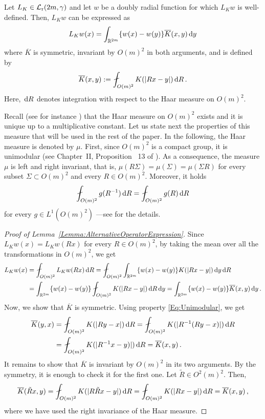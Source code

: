\begin{lemma} \label{Lemma:AlternativeOperatorExpression}
Let $L_K \in \mathcal{L}_{\mathrm{r}}(2m,\gamma)$ and let $w$ be a doubly radial function for which $L_K w$ is well-defined. Then, $L_K w$ can be expressed as
$$
L_K w(x) = \int_{\mathbb{R}^{2m}} \{w(x) - w(y)\} \overline{K}(x,y) \,\mathrm{d} y
$$
where $\overline{K}$ is symmetric, invariant by $O(m)^2$ in both arguments, and is defined by
\begin{equation*}
\overline{K}(x,y) := \average_{O(m)^2} K(|Rx - y|)\d R\,.
\end{equation*}
Here, $\,\mathrm{d} R$ denotes integration with respect to the Haar measure on $O(m)^2$.
\end{lemma}

Recall (see for instance \cite{Nachbin}) that the Haar measure on $O(m)^2$ exists and it is unique up to a
multiplicative constant. Let us state next the properties of this measure that will be used in the rest of the
paper. In the following, the Haar measure is denoted by $\mu$. First, since $O(m)^2$ is a compact
group, it is unimodular (see Chapter~II, Proposition~ 13 of \cite{Nachbin}). As a consequence, the
measure $\mu$ is left and right invariant, that is, $\mu(R\Sigma) = \mu(\Sigma) = \mu(\Sigma R) $
for every subset $\Sigma \subset O(m)^2$ and every $R\in O(m)^2$. Moreover, it holds
\begin{equation}
\label{Eq:Unimodular}
\average_{O(m)^2} g(R^{-1}) \d R = \average_{O(m)^2} g(R) \d R
\end{equation}	
for every $g\in L^1(O(m)^2)$ ---see \cite{Nachbin} for the details.

\begin{proof}[Proof of Lemma~\ref{Lemma:AlternativeOperatorExpression}]
Since $L_K w (x) = L_K w (Rx)$ for every $R\in O(m)^2$, by taking the mean over all the transformations in $O(m)^2$, we get
\begin{align*}
L_K w(x) &= \average_{O(m)^2} L_K w(Rx)\d R =  \average_{O(m)^2} \int_{\R^{2m}} \{w(x) - w(y)\}K(|Rx - y|) \d y \d R\\
&= \int_{\R^{2m}} \{w(x) - w(y)\}  \average_{O(m)^2} K(|Rx - y|) \d R  \d y = \int_{\R^{2m}} \{w(x) - w(y)\}  \overline{K}(x,y) \d y\,.
\end{align*}
Now, we show that $\overline{K}$ is symmetric. Using property \eqref{Eq:Unimodular}, we get
\begin{align*}
\overline{K}(y,x) &= \average_{O(m)^2} K(|R y - x|)\d R = \average_{O(m)^2} K(|R^{-1} (R y - x)|)\d R \\
&= \average_{O(m)^2} K(|R^{-1}x-y)|)\d R = \overline{K}(x,y)\,.
\end{align*}
It remains to show that
$\overline{K}$ is invariant by $O(m)^2$ in its two arguments. By the symmetry, it is enough to
check it for the first one. Let $\tilde{R} \in O^2(m)^2$. Then,
$$
\overline{K} (\tilde{R}x, y) = \average_{O(m)^2} K(|R \tilde{R} x - y|)\d R  = \average_{O(m)^2} K(|R x - y|)\d R = \overline{K} (x, y)\,,
$$
where we have used the right invariance of the Haar measure.
\end{proof}



